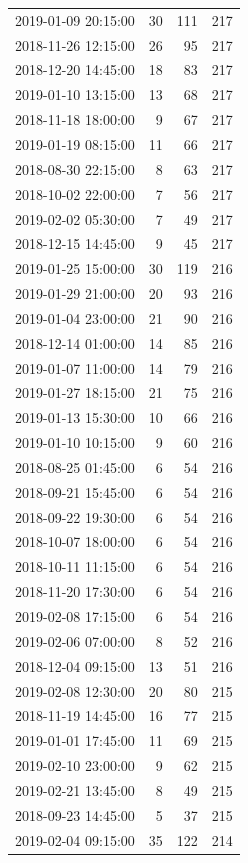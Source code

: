 \begin{tabular}{lrrr}
2019-01-09 20:15:00 & 30 & 111 & 217 \\
2018-11-26 12:15:00 & 26 & 95 & 217 \\
2018-12-20 14:45:00 & 18 & 83 & 217 \\
2019-01-10 13:15:00 & 13 & 68 & 217 \\
2018-11-18 18:00:00 & 9 & 67 & 217 \\
2019-01-19 08:15:00 & 11 & 66 & 217 \\
2018-08-30 22:15:00 & 8 & 63 & 217 \\
2018-10-02 22:00:00 & 7 & 56 & 217 \\
2019-02-02 05:30:00 & 7 & 49 & 217 \\
2018-12-15 14:45:00 & 9 & 45 & 217 \\
2019-01-25 15:00:00 & 30 & 119 & 216 \\
2019-01-29 21:00:00 & 20 & 93 & 216 \\
2019-01-04 23:00:00 & 21 & 90 & 216 \\
2018-12-14 01:00:00 & 14 & 85 & 216 \\
2019-01-07 11:00:00 & 14 & 79 & 216 \\
2019-01-27 18:15:00 & 21 & 75 & 216 \\
2019-01-13 15:30:00 & 10 & 66 & 216 \\
2019-01-10 10:15:00 & 9 & 60 & 216 \\
2018-08-25 01:45:00 & 6 & 54 & 216 \\
2018-09-21 15:45:00 & 6 & 54 & 216 \\
2018-09-22 19:30:00 & 6 & 54 & 216 \\
2018-10-07 18:00:00 & 6 & 54 & 216 \\
2018-10-11 11:15:00 & 6 & 54 & 216 \\
2018-11-20 17:30:00 & 6 & 54 & 216 \\
2019-02-08 17:15:00 & 6 & 54 & 216 \\
2019-02-06 07:00:00 & 8 & 52 & 216 \\
2018-12-04 09:15:00 & 13 & 51 & 216 \\
2019-02-08 12:30:00 & 20 & 80 & 215 \\
2018-11-19 14:45:00 & 16 & 77 & 215 \\
2019-01-01 17:45:00 & 11 & 69 & 215 \\
2019-02-10 23:00:00 & 9 & 62 & 215 \\
2019-02-21 13:45:00 & 8 & 49 & 215 \\
2018-09-23 14:45:00 & 5 & 37 & 215 \\
2019-02-04 09:15:00 & 35 & 122 & 214 \\

\end{tabular}
